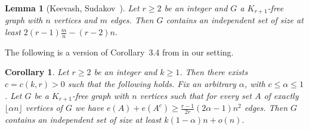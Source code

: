 \documentclass[11pt]{article}
\newtheorem{lemma}[theo]{Lemma}
\newtheorem{corl}[theo]{Corollary}
\theoremstyle{definition}
\numberwithin{theo}{section}
\begin{document}
\begin{lemma}[Keevash, Sudakov~\cite{MR1967401}]
\label{lem:KeesudindesetKr}
Let $r\geq2$ be an integer and $G$ a $K_{r+1}$-free graph with $n$ vertices and $m$ edges. Then $G$ contains an independent set of size at least $2(r-1)\frac{m}{n}-(r-2)n.$
\end{lemma}
The following is a version of Corollary~3.4 from \cite{MR1967401} in our setting.
\begin{corl}
\label{corlindepsetKe}
Let $r\geq2$ be an integer and $k\geq1$. Then there exists $c=c(k,r)>0$ such that the following holds. Fix an arbitrary $\alpha$, with $c\leq\alpha\leq1$. Let $G$ be a $K_{r+1}$-free graph with $n$ vertices such that for every set $A$ of exactly $\lfloor \alpha n\rfloor$ vertices of $G$ we have $e(A)+e(A^c)\geq \frac{r-1}{2r}(2\alpha-1)n^2$ edges. Then $G$ contains an independent set of size at least $k(1-\alpha)n+o(n)$.
\end{corl}
\end{document}
